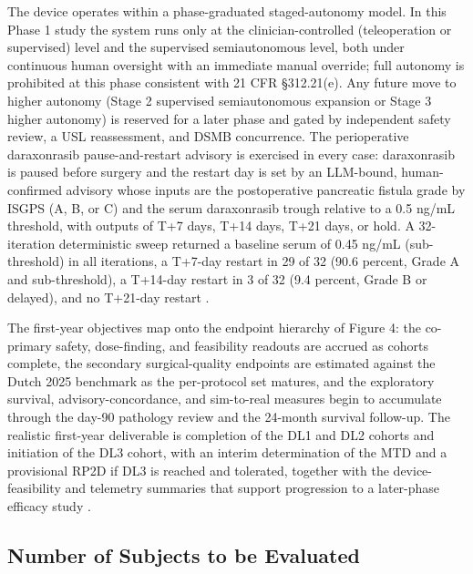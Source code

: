 The device operates within a phase-graduated staged-autonomy model. In this Phase 1
study the system runs only at the clinician-controlled (teleoperation or supervised)
level and the supervised semiautonomous level, both under continuous human oversight
with an immediate manual override; full autonomy is prohibited at this phase
consistent with 21 CFR \S 312.21(e). Any future move to higher autonomy (Stage 2
supervised semiautonomous expansion or Stage 3 higher autonomy) is reserved for a
later phase and gated by independent safety review, a USL reassessment, and DSMB
concurrence. The perioperative daraxonrasib pause-and-restart advisory is exercised
in every case: daraxonrasib is paused before surgery and the restart day is set by
an LLM-bound, human-confirmed advisory whose inputs are the postoperative pancreatic
fistula grade by ISGPS (A, B, or C) and the serum daraxonrasib trough relative to a
0.5 ng/mL threshold, with outputs of T+7 days, T+14 days, T+21 days, or hold. A
32-iteration deterministic sweep returned a baseline serum of 0.45 ng/mL
(sub-threshold) in all iterations, a T+7-day restart in 29 of 32 (90.6 percent,
Grade A and sub-threshold), a T+14-day restart in 3 of 32 (9.4 percent, Grade B or
delayed), and no T+21-day restart \cite{daraxwhipple,clintrustpai}.

The first-year objectives map onto the endpoint hierarchy of Figure 4: the
co-primary safety, dose-finding, and feasibility readouts are accrued as cohorts
complete, the secondary surgical-quality endpoints are estimated against the Dutch
2025 benchmark as the per-protocol set matures, and the exploratory survival,
advisory-concordance, and sim-to-real measures begin to accumulate through the day-90
pathology review and the 24-month survival follow-up. The realistic first-year
deliverable is completion of the DL1 and DL2 cohorts and initiation of the DL3
cohort, with an interim determination of the MTD and a provisional RP2D if DL3 is
reached and tolerated, together with the device-feasibility and telemetry summaries
that support progression to a later-phase efficacy study \cite{daraxwhipple}.

\subsection{Number of Subjects to be Evaluated}

